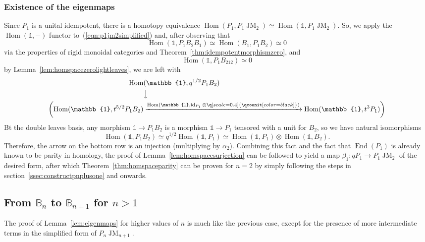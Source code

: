\documentclass[11pt]{article}
\DeclareMathOperator{\Hom}{Hom}
\DeclareMathOperator{\End}{End}
\DeclareMathOperator{\id}{id}
\DeclareMathOperator{\JM}{JM}
\theoremstyle{definition}
\theoremstyle{remark}
\numberwithin{equation}{section}
\begin{document}
\subsubsection{Existence of the eigenmaps}
Since $P_1$ is a unital idempotent, there is a homotopy equivalence
$\Hom(P_1,P_1\JM_2)\simeq \Hom(\mathbb{1},P_1\JM_2)$. So, we apply the
$\Hom(\mathbb{1},-)$ functor to~(\ref{eqn:p1jm2simplified}) and, after observing that
\[\Hom(\mathbb{1},P_1B_2B_1)\simeq \Hom(B_1,P_1B_2)\simeq 0\]
via the properties of rigid monoidal categories and
Theorem~\ref{thm:idempotentmorphismzero}, and
\[\Hom(\mathbb{1},P_1B_{212})\simeq 0\]
by Lemma~\ref{lem:homspacezerolightleaves},
we are left with
\begin{align*}
	\Hom &(\mathbb{1},q^{1/2}P_1B_{2}) \\
	     &{\big\downarrow}\\
	     \biggl( \Hom(\mathbb{1},t^{5/2}P_1B_{2})
	     & \xrightarrow{\Hom(\mathbb{1},\id_{P_1} \otimes
	     \q[scale=0.4]{\qcounit[color=black]})}
     \Hom(\mathbb{1},t^{3}P_1) \biggr)
\end{align*}
Bt the double leaves basis, any morphism $\mathbb{1}\to P_1B_2$ is
a morphism $\mathbb{1}\to P_1$ tensored with a unit for $B_2$, so we have
natural isomorphisms
\[\Hom(\mathbb{1},P_1B_2)\simeq q^{1/2}\Hom(\mathbb{1},P_1)\simeq
\Hom(\mathbb{1},P_1)\otimes \Hom(\mathbb{1},B_2).\]
Therefore, the arrow
on the bottom row is an injection (multiplying by $\alpha_2$). Combining
this fact and the fact that $\End(P_1)$ is already known to be parity
in homology, the proof
of Lemma~\ref{lem:homspacesurjection} can be followed to yield a map
$\beta_1:qP_1\to P_1\JM_2$ of the desired form, after which
Theorem~\ref{thm:homspaceparity} can be proven for $n=2$ by simply
following the steps in section~\ref{ssec:constructpnplusone} and onwards.
\subsection{From $\mathbb{B}_n$ to $\mathbb{B}_{n+1}$ for $n > 1$}
The proof of
Lemma~\ref{lem:eigenmaps}
for higher values of $n$ is much like the previous case, except for
the presence of more intermediate terms in the simplified form of
$P_n\JM_{n+1}$.
\end{document}
